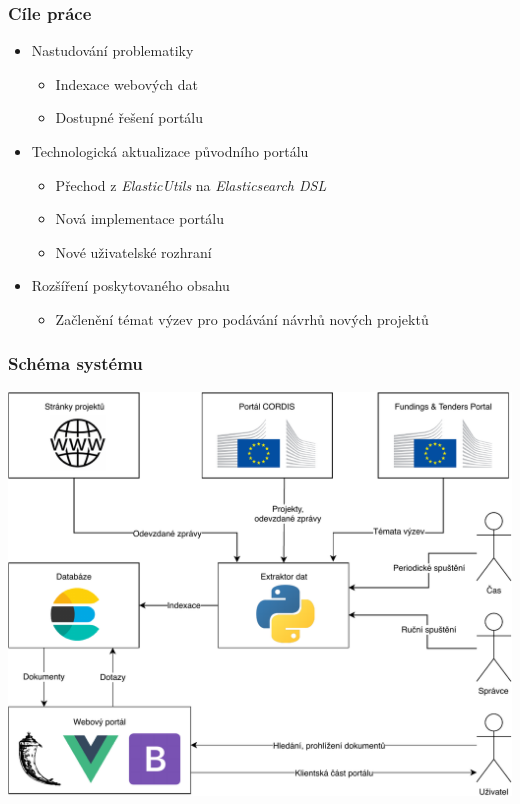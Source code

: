 \documentclass[10pt,xcolor=pdflatex]{beamer}
\begin{document}
\begin{frame}
    \frametitle{Cíle práce}
    \begin{itemize}
        \item Nastudování problematiky
            \begin{itemize}
                \item Indexace webových dat
                \item Dostupné řešení portálu
        	\end{itemize}
        \item Technologická aktualizace původního portálu
            \begin{itemize}
                \item Přechod z \emph{ElasticUtils} na \emph{Elasticsearch DSL}
                \item Nová implementace portálu 
                \item Nové uživatelské rozhraní
        	\end{itemize}
    	\item Rozšíření poskytovaného obsahu
    	    \begin{itemize}
                \item Začlenění témat výzev pro podávání návrhů nových projektů
        	\end{itemize}
	\end{itemize}
\end{frame}

\begin{frame}
    \frametitle{Schéma systému}
    \begin{center}
        \includegraphics[scale=0.5]{img/my-scheme.pdf}
    \end{center}
\end{frame}
\end{document}
